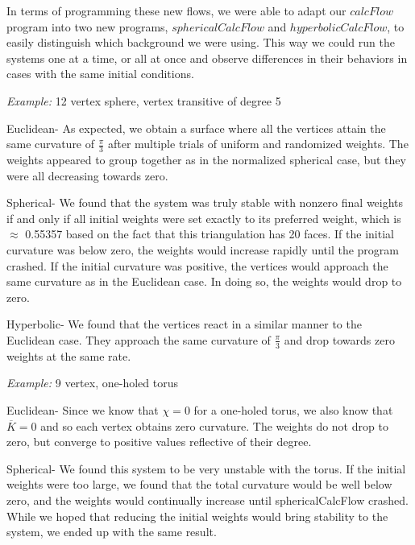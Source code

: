 \documentclass[12pt]{article}
\begin{document}
\noindent In terms of programming these new flows, we were able to adapt our $calcFlow$ program into two new programs, $sphericalCalcFlow$ and $hyperbolicCalcFlow$, to easily distinguish which background we were using. This way we could run the systems one at a time, or all at once and observe differences in their behaviors in cases with the same initial conditions. \newline

\noindent \textit{Example:} 12 vertex sphere, vertex transitive of degree 5\newline

\noindent Euclidean- As expected, we obtain a surface where all the vertices attain the same curvature of $\frac{\pi}{3}$ after multiple trials of uniform and randomized weights. The weights appeared to group together as in the normalized spherical case, but they were all decreasing towards zero.\newline

\noindent Spherical- We found that the system was truly stable with nonzero final weights if and only if all initial weights were set exactly to its preferred weight, which is $\approx$ 0.55357 based on the fact that this triangulation has 20 faces. If the initial curvature was below zero, the weights would increase rapidly until the program crashed. If the initial curvature was positive, the vertices would approach the same curvature as in the Euclidean case. In doing so, the weights would drop to zero.\newline

\noindent Hyperbolic- We found that the vertices react in a similar manner to the Euclidean case. They approach the same curvature of $\frac{\pi}{3}$ and drop towards zero weights at the same rate.\newline 

\noindent \textit{Example:} 9 vertex, one-holed torus\newline

\noindent Euclidean- Since we know that $\chi = 0$ for a one-holed torus, we also know that $\overline{K} = 0$ and so each vertex obtains zero curvature. The weights do not drop to zero, but converge to positive values reflective of their degree. \newline

\noindent Spherical- We found this system to be very unstable with the torus. If the initial weights were too large, we found that the total curvature would be well below zero, and the weights would continually increase until sphericalCalcFlow crashed. While we hoped that reducing the initial weights would bring stability to the system, we ended up with the same result.\newline
\end{document}
